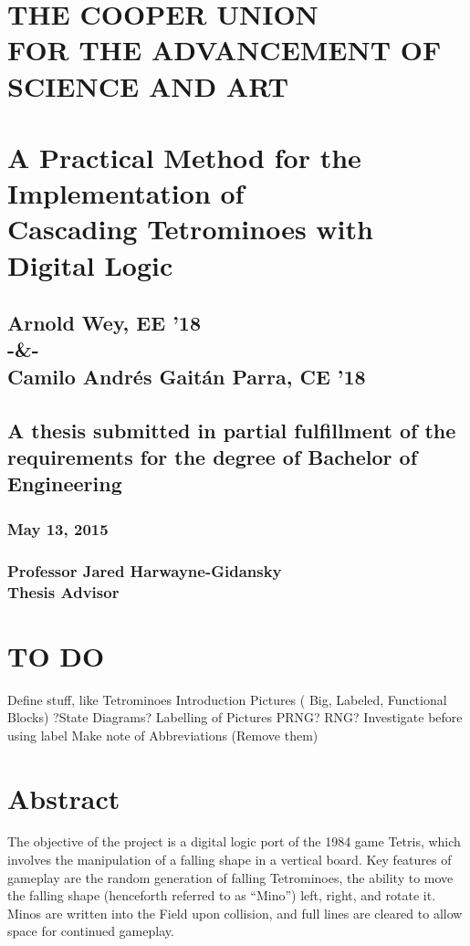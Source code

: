 \documentclass[letterpaper,titlepage,oneside]{article}
\begin{document}
\begin{center}
\section*{THE COOPER UNION \\FOR THE ADVANCEMENT OF SCIENCE AND ART\\[35pt]}
\section*{A Practical Method for the Implementation of \\Cascading Tetrominoes with Digital Logic\\[35pt]}
\subsection*{Arnold Wey, EE '18 \\[15pt]-\&-\\[15pt] Camilo Andr\'es Gait\'an Parra, CE '18\\[75pt]}
\subsection*{A thesis submitted in partial fulfillment of the requirements for the degree of Bachelor of Engineering\\[75pt]}
\subsubsection*{May 13, 2015\\[60pt]}
\subsubsection*{Professor Jared Harwayne-Gidansky\\[5pt]Thesis Advisor}
\end{center}
\clearpage


\section*{TO DO}
Define stuff, like Tetrominoes
Introduction
Pictures ( Big, Labeled, Functional Blocks)
?State Diagrams?
Labelling of Pictures
PRNG? RNG? Investigate before using label
Make note of Abbreviations (Remove them)


\section*{Abstract}
The objective of the project is a digital logic port of the 1984 game Tetris, which involves the manipulation of a falling shape in a vertical board. Key features of gameplay are the random generation of falling Tetrominoes, the ability to move the falling shape (henceforth referred to as ``Mino'') left, right, and rotate it. Minos are written into the Field upon collision, and full lines are cleared to allow space for continued gameplay. 
\end{document}
